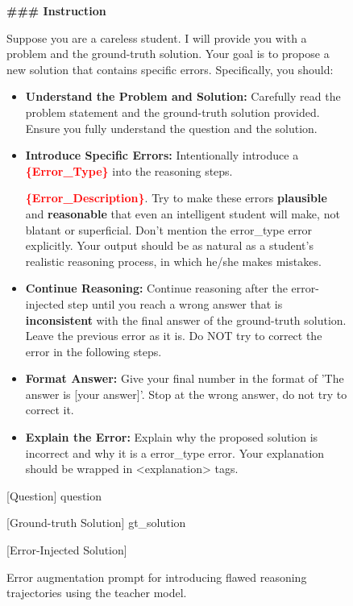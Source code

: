 
\begin{figure}[htbp]
    \small
    \begin{tcolorbox}[left=3pt,right=3pt,top=3pt,bottom=3pt,title=\textbf{Error Augmentation Prompt}]
    \textbf{\#\#\# Instruction}

    Suppose you are a careless student. I will provide you with a problem and the ground-truth solution. Your goal is to propose a new solution that contains specific errors. Specifically, you should:

    \begin{itemize}
        \item \textbf{Understand the Problem and Solution:} Carefully read the problem statement and the ground-truth solution provided. Ensure you fully understand the question and the solution. 
        
        \item \textbf{Introduce Specific Errors:}  Intentionally introduce a \textcolor{red}{\textbf{\{Error\_Type\}}} into the reasoning steps. 
        
        \textcolor{red}
        {\textbf{\{Error\_Description\}}}. Try to make these errors \textbf{plausible} and \textbf{reasonable} that even an intelligent student will make, not blatant or superficial. Don't mention the {error\_type} error explicitly. Your output should be as natural as a student's realistic reasoning process, in which he/she makes mistakes.

        \item \textbf{Continue Reasoning:} Continue reasoning after the error-injected step until you reach a wrong answer that is \textbf{inconsistent} with the final answer of the ground-truth solution. Leave the previous error as it is. Do NOT try to correct the error in the following steps.

        \item \textbf{Format Answer:} Give your final number in the format of 'The answer is [your answer]'. Stop at the wrong answer, do not try to correct it.

        \item \textbf{Explain the Error:} Explain why the proposed solution is incorrect and why it is a {error\_type} error. Your explanation should be wrapped in <explanation> tags.
    \end{itemize}

[Question]
{question}

[Ground-truth Solution] 
{gt\_solution}

[Error-Injected Solution]


\end{tcolorbox}
\caption{Error augmentation prompt for introducing flawed reasoning trajectories using the teacher model.}
\label{fig:introduce_error_prompt}
\end{figure}